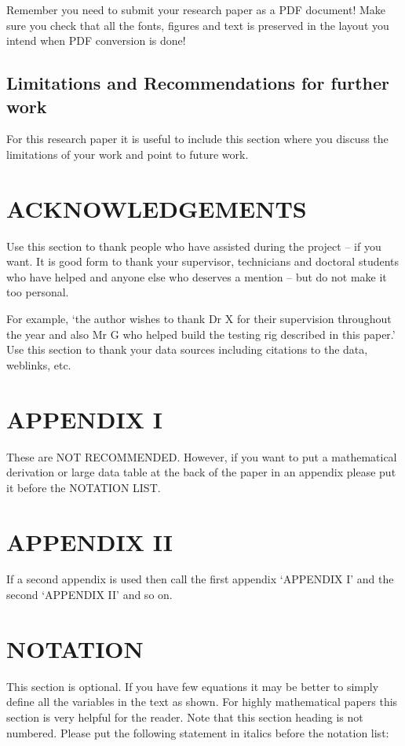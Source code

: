 \documentclass[a4paper,10pt]{article}
\begin{document}
Remember you need to submit your research paper as a PDF document! Make sure you check that all the fonts, figures and text is preserved in the layout you intend when PDF conversion is done!


\subsection{Limitations and Recommendations for further work}

For this research paper it is useful to include this section where you discuss the limitations of your work and point to future work.

\section{ACKNOWLEDGEMENTS}

Use this section to thank people who have assisted during the project – if you want. It is good form to thank your supervisor, technicians and doctoral students who have helped and anyone else who deserves a mention – but do not make it too personal. 

For example, ‘the author wishes to thank Dr X for their supervision throughout the year and also Mr G who helped build the testing rig described in this paper.’
Use this section to thank your data sources including citations to the data, weblinks, etc.

\section{APPENDIX I}

These are NOT RECOMMENDED. However, if you want to put a mathematical derivation or large data table at the back of the paper in an appendix please put it before the NOTATION LIST. 

\section{APPENDIX II}

If a second appendix is used then call the first appendix ‘APPENDIX I’ and the second ‘APPENDIX II’ and so on.

\section{NOTATION}

This section is optional. If you have few equations it may be better to simply define all the variables in the text as shown. For highly mathematical papers this section is very helpful for the reader. Note that this section heading is not numbered. Please put the following statement in italics before the notation list:
\end{document}
